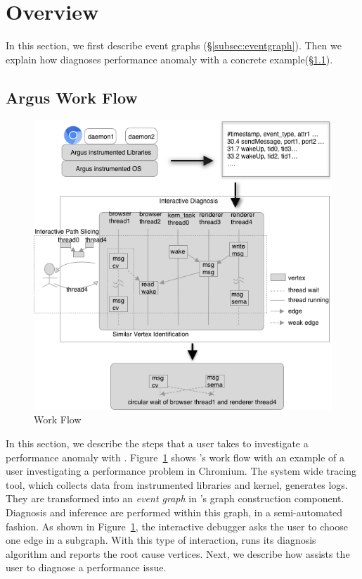 \section{Overview}\label{sec:overview}

In this section, we first describe \xxx event graphs
(\S\ref{subsec:eventgraph}). Then we explain how \xxx diagnoses performance
anomaly with a concrete example(\S\ref{subsec:overflow}).



\subsection{Argus Work Flow} \label{subsec:overflow}

\begin{figure}[tb]
    \centering
	\includegraphics[width=\columnwidth]{./figures/Argus_overview.png}
    \caption{\xxx Work Flow}
    \label{fig:argus-overview}
\end{figure}

In this section, we describe the steps that a user takes to investigate a
performance anomaly with \xxx.  Figure~\ref{fig:argus-overview} shows \xxx's
work flow with an example of a user investigating a performance problem in
Chromium.  The system wide tracing tool, which collects data from \xxx
instrumented libraries and kernel, generates logs. They are transformed into an
\emph{event graph} in \xxx's graph construction component. Diagnosis and
inference are performed within this graph, in a semi-automated fashion.  As
shown in Figure~\ref{fig:argus-overview}, the \xxx interactive debugger asks
the user to choose one edge in a subgraph. With this type of interaction, \xxx
runs its diagnosis algorithm and reports the root cause vertices.  Next, we
describe how \xxx assists the user to diagnose a performance issue.

